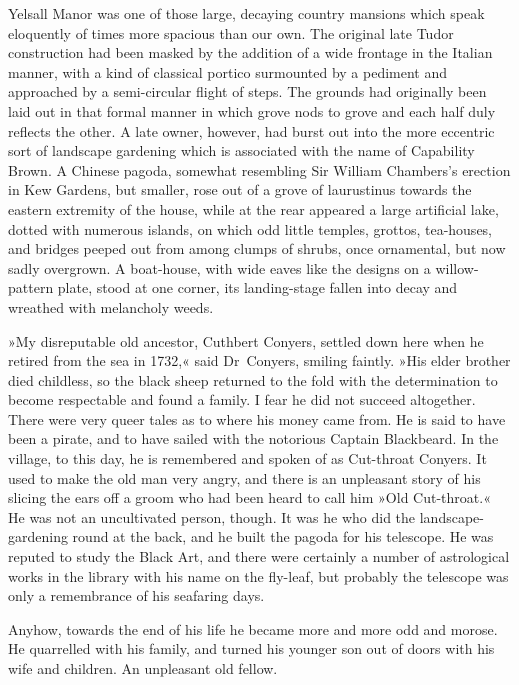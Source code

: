 \divider
Yelsall Manor was one of those large, decaying country mansions which speak eloquently of times more spacious than our own. The original late Tudor construction had been masked by the addition of a wide frontage in the Italian manner, with a kind of classical portico surmounted by a pediment and approached by a semi-circular flight of steps. The grounds had originally been laid out in that formal manner in which grove nods to grove and each half duly reflects the other. A late owner, however, had burst out into the more eccentric sort of landscape gardening which is associated with the name of Capability Brown. A Chinese pagoda, somewhat resembling Sir William Chambers's erection in Kew Gardens, but smaller, rose out of a grove of laurustinus towards the eastern extremity of the house, while at the rear appeared a large artificial lake, dotted with numerous islands, on which odd little temples, grottos, tea-houses, and bridges peeped out from among clumps of shrubs, once ornamental, but now sadly overgrown. A boat-house, with wide eaves like the designs on a willow-pattern plate, stood at one corner, its landing-stage fallen into decay and wreathed with melancholy weeds.

»My disreputable old ancestor, Cuthbert Conyers, settled down here when he retired from the sea in 1732,« said Dr~Conyers, smiling faintly. »His elder brother died childless, so the black sheep returned to the fold with the determination to become respectable and found a family. I fear he did not succeed altogether. There were very queer tales as to where his money came from. He is said to have been a pirate, and to have sailed with the notorious Captain Blackbeard. In the village, to this day, he is remembered and spoken of as Cut-throat Conyers. It used to make the old man very angry, and there is an unpleasant story of his slicing the ears off a groom who had been heard to call him »Old Cut-throat.« He was not an uncultivated person, though. It was he who did the landscape-gardening round at the back, and he built the pagoda for his telescope. He was reputed to study the Black Art, and there were certainly a number of astrological works in the library with his name on the fly-leaf, but probably the telescope was only a remembrance of his seafaring days.

Anyhow, towards the end of his life he became more and more odd and morose. He quarrelled with his family, and turned his younger son out of doors with his wife and children. An unpleasant old fellow.

